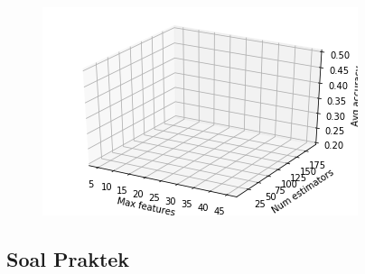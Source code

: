 \begin{enumerate}
	\hfill\break
	\begin{figure}[H]
	\centering
		\includegraphics[width=8 cm]{figures/1174006/chapter5/soalteori/v.PNG}
	\end{figure}
\end{enumerate}

\subsection{Soal Praktek}
